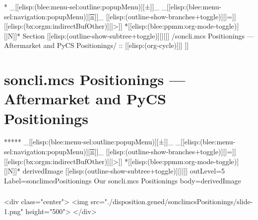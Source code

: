 \begin{whenOrg}
*  _[[elisp:(blee:menu-sel:outline:popupMenu)][±]]_ _[[elisp:(blee:menu-sel:navigation:popupMenu)][Ξ]]_ [[elisp:(outline-show-branches+toggle)][|=]] [[elisp:(bx:orgm:indirectBufOther)][|>]] *[[elisp:(blee:ppmm:org-mode-toggle)][|N]]*  Section    [[elisp:(outline-show-subtree+toggle)][||]]   /soncli.mcs Positionings --- Aftermarket and PyCS Positionings/ ::  [[elisp:(org-cycle)][| ]]
\end{whenOrg}

\section{soncli.mcs Positionings --- Aftermarket and PyCS Positionings}

\begin{whenOrg}
*****  _[[elisp:(blee:menu-sel:outline:popupMenu)][±]]_ _[[elisp:(blee:menu-sel:navigation:popupMenu)][Ξ]]_ [[elisp:(outline-show-branches+toggle)][|=]] [[elisp:(bx:orgm:indirectBufOther)][|>]] *[[elisp:(blee:ppmm:org-mode-toggle)][|N]]*  derivedImage [[elisp:(outline-show-subtree+toggle)][||]] outLevel=5 Label=sonclimcsPositionings Our soncli.mcs Positionings body=derivedImage

\end{whenOrg}

\begin{htmlonly}

\begin{frame}[fragile,plain,label=sonclimcsPositionings]
    \frametitle{}
    \framesubtitle{}
    \begin{rawhtml}
<div class="center">
<img src="./disposition.gened/sonclimcsPositionings/slide-1.png" height="500">
</div>
    \end{rawhtml}
\end{frame}
\end{htmlonly}

